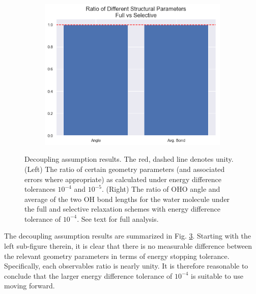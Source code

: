 \begin{figure}
\begin{subfigure}[t]{0.45\textwidth}
                 \label{fig:ediff_geom_ratios}
             \end{subfigure}
             \hfill
             \begin{subfigure}[t]{0.45\textwidth}
                 \centering
                 \includegraphics[width=\textwidth]{Figures/System/selective_v_full_geom_params.png}
                 \label{fig:selective_v_full}
             \end{subfigure}
                \caption{Decoupling assumption results. The red, dashed line denotes unity. (Left) The ratio of certain geometry parameters (and associated errors where appropriate) as calculated under energy difference tolerances $10^{-4}$ and $10^{-5}$. (Right) The ratio of OHO angle and average of the two OH bond lengths for the water molecule under the full and selective relaxation schemes with energy difference tolerance of $10^{-4}$. See text for full analysis.}
                \label{fig:decouple_assumption}
        \end{figure}
        
        The decoupling assumption results are summarized in Fig. \ref{fig:decouple_assumption}. Starting with the left sub-figure therein, it is clear that there is no measurable difference between the relevant geometry parameters in terms of energy stopping tolerance. Specifically, each observables ratio is nearly unity. It is therefore reasonable to conclude that the larger energy difference tolerance of $10^{-4}$ is suitable to use moving forward.
        
